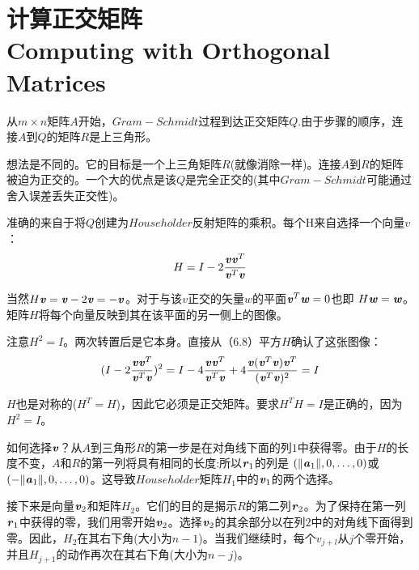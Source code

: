 \section[计算正交矩阵]{计算正交矩阵\\Computing with Orthogonal Matrices}
从$m\times n$矩阵$A$开始，$Gram-Schmidt$过程到达正交矩阵$Q$.由于步骤的顺序，连接$A$到$Q$的矩阵$R$是上三角形。

想法是不同的。它的目标是一个上三角矩阵$R$(就像消除一样)。连接$A$到$R$的矩阵被迫为正交的。一个大的优点是该$Q$是完全正交的(其中$Gram-Schmidt$可能通过舍入误差丢失正交性)。
 
准确的来自于将$Q$创建为$Householder$反射矩阵的乘积。每个H来自选择一个向量$v$：
\begin{align}
H=I-2\frac{\textbf{\textit{v}}\textbf{\textit{v}}^{T}}{\textbf{\textit{v}}^{T}\textbf{\textit{v}}}
\end{align}
 
当然$H\textbf{\textit{v}}=\textbf{\textit{v}}-2\textbf{\textit{v}}=-\textbf{\textit{v}}$。对于与该$v$正交的矢量$w$的平面$ \textbf{\textit{v}}^{T}\textbf{\textit{w}}=0$也即 $ H\textbf{\textit{w}}=\textbf{\textit{w}}$。矩阵$H$将每个向量反映到其在该平面的另一侧上的图像。
 
注意$H^{2}=I$。两次转置后是它本身。直接从（6.8）平方$H$确认了这张图像：
\begin{align*}
(I-2\frac{\textbf{\textit{v}}\textbf{\textit{v}}^{T}}{\textbf{\textit{v}}^{T}\textbf{\textit{v}}})^{2}=I-4\frac{\textbf{\textit{v}}\textbf{\textit{v}}^{T}}{\textbf{\textit{v}}^{T}\textbf{\textit{v}}}+4\frac{\textbf{\textit{v}}(\textbf{\textit{v}}^{T}\textbf{\textit{v}})\textbf{\textit{v}}^{T}}{(\textbf{\textit{v}}^{T}\textbf{\textit{v}})^{2}}=I
\end{align*}
 
$H$也是对称的($H^{T}=H$)，因此它必须是正交矩阵。要求$H^{T}H=I$是正确的，因为$H^{2}=I$。
 
如何选择$\textbf{\textit{v}}$？从$A$到三角形$R$的第一步是在对角线下面的列$1$中获得零。由于$H$的长度不变，$A$和$R$的第一列将具有相同的长度:所以$\textbf{\textit{r}}_{1}$的列是
$(\lVert\textbf{\textit{a}}_{1}\rVert,0,\ldots,0)$或 $(-\lVert\textbf{\textit{a}}_{1}\rVert,0,\ldots,0)$。这导致$Householder$矩阵$H_{1}$中的$\textbf{\textit{v}}_{1}$的两个选择。
 
接下来是向量$\textbf{\textit{v}}_{2}$和矩阵$H_{2}$。它们的目的是揭示$R$的第二列$\textbf{\textit{r}}_{2}$。为了保持在第一列$\textbf{\textit{r}}_{1}$中获得的零，我们用零开始$\textbf{\textit{v}}_{2}$。选择$\textbf{\textit{v}}_{2}$的其余部分以在列$2$中的对角线下面得到零。因此，$H_{2}$在其右下角(大小为$n-1$)。当我们继续时，每个$v_{j+l}$从$j$个零开始，并且$H_{j+1}$的动作再次在其右下角(大小为$n-j$)。

